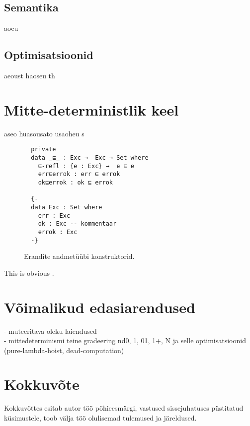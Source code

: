\documentclass[a4paper,12pt]{article}
\begin{document}
\subsection{Semantika}
aoeu
\subsection{Optimisatsioonid}
aeoust haoseu th

\clearpage

\section{Mitte-deterministlik keel}
aseo huasousato usaoheu s

\begin{figure}
  \begin{verbatim}
  private
  data _⊑_ : Exc →  Exc → Set where
    ⊑-refl : {e : Exc} →  e ⊑ e
    err⊑errok : err ⊑ errok
    ok⊑errok : ok ⊑ errok

  {-
  data Exc : Set where
    err : Exc
    ok : Exc -- kommentaar 
    errok : Exc
  -}
  \end{verbatim}
  \caption{Erandite andmetüübi konstruktorid.}
\end{figure}

This is obvious \cite{Benton2016}. \cite{Katsumata2014}

\clearpage

\section{Võimalikud edasiarendused}

- muteeritava oleku laiendused\\
- mittedeterminismi teine gradeering nd0, 1, 01, 1+, N ja selle optimisatsioonid (pure-lambda-hoist, dead-computation)

\clearpage

\section{Kokkuvõte}
Kokkuvõttes esitab autor töö põhieesmärgi, vastused sissejuhatuses püstitatud
küsimustele, toob välja töö olulisemad tulemused ja järeldused.

\clearpage

\renewcommand{\baselinestretch}{1.15}
\small



\end{document}
